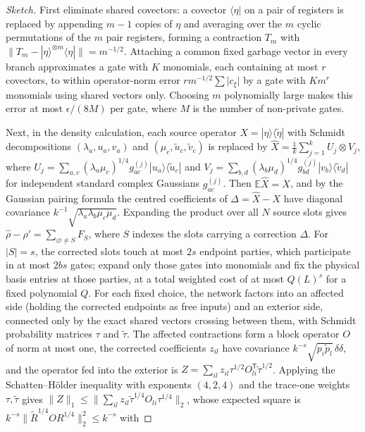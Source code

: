 \documentclass[aps,prx,reprint,superscriptaddress,floatfix,nofootinbib,longbibliography,amsmath,amssymb]{revtex4-2}
\newcommand{\E}{\mathbb E}
\newcommand{\norm}[1]{\lVert #1\rVert}
\newcommand{\abs}[1]{\lvert #1\rvert}
\providecommand{\ket}[1]{|#1\rangle}\renewcommand{\ket}[1]{|#1\rangle}
\providecommand{\bra}[1]{\langle #1|}\renewcommand{\bra}[1]{\langle #1|}
\theoremstyle{plain}
\theoremstyle{definition}
\begin{document}
\begin{proof}[Sketch]
First eliminate shared covectors: a covector $\bra\eta$ on a pair of
registers is replaced by appending $m-1$ copies of $\eta$ and averaging over the
$m$ cyclic permutations of the $m$ pair registers, forming a contraction $T_m$ with
$\norm{T_m-\ket\eta^{\otimes m}\bra\eta}=m^{-1/2}$. Attaching a common fixed
garbage vector in every branch approximates a gate with $K$ monomials, each containing at
most $r$ covectors, to within operator-norm error
$rm^{-1/2}\sum\abs{c_\xi}$ by a gate with $Km^r$ monomials using shared
vectors only. Choosing $m$ polynomially large makes this error at most
$\epsilon/(8M)$ per gate, where $M$ is the number of non-private gates.

Next, in the density calculation, each source operator $X=\ket\eta\bra{\tilde\eta}$
with Schmidt decompositions $(\lambda_a,u_a,v_a)$ and $(\mu_c,\tilde u_c,\tilde v_c)$
is replaced by $\widehat X=\frac1k\sum_{j=1}^kU_j\otimes V_j$, where
$U_j=\sum_{a,c}(\lambda_a\mu_c)^{1/4}g^{(j)}_{ac}\ket{u_a}\bra{\tilde u_c}$ and
$V_j=\sum_{b,d}(\lambda_b\mu_d)^{1/4}\overline{g^{(j)}_{bd}}\ket{v_b}\bra{\tilde v_d}$
for independent standard complex Gaussians $g^{(j)}_{ac}$. Then
$\E\widehat X=X$, and by the Gaussian pairing formula the centred coefficients of $\Delta=\widehat X-X$ have
diagonal covariance $k^{-1}\sqrt{\lambda_a\lambda_b\mu_c\mu_d}$. Expanding the product over all $N$ source
slots gives $\widehat\rho-\rho'=\sum_{\varnothing\ne S}F_S$, where $S$ indexes
the slots carrying a correction $\Delta$. For $\abs S=s$, the corrected slots touch
at most $2s$ endpoint parties, which participate in at most $2bs$ gates; expand only
those gates into monomials and fix the physical basis entries at those
parties, at a total weighted cost of at most $Q(L)^s$ for a fixed polynomial $Q$.
For each fixed choice, the network factors into an affected side
(holding the corrected endpoints as free inputs) and an exterior side, connected
only by the exact shared vectors crossing between them, with Schmidt
probability matrices $\tau$ and $\tilde\tau$. The affected contractions form a
block operator $O$ of norm at most one, the corrected coefficients $z_{il}$
have covariance $k^{-s}\sqrt{p_i\tilde p_l}\,\delta\delta$, and the operator fed into the exterior
is $Z=\sum_{il}z_{il}\tau^{1/2}O_{li}^{\mathsf T}\tilde\tau^{1/2}$.
Applying the Schatten--Hölder inequality with exponents $(4,2,4)$ and the trace-one weights $\tau,\tilde\tau$ gives
$\norm Z_1\le\norm{\sum_{il}z_{il}\tilde\tau^{1/4}O_{li}\tau^{1/4}}_2$, whose expected
square is $k^{-s}\norm{\widetilde R^{1/4}OR^{1/4}}_2^2\le k^{-s}$ with

\end{proof}
\end{document}
